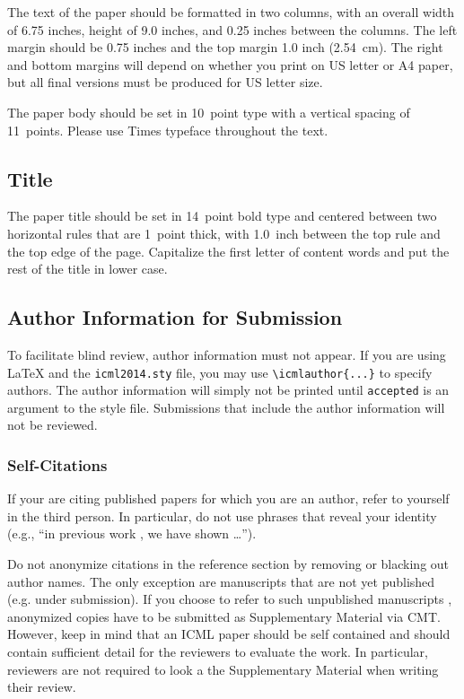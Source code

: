 \documentclass{article}
\begin{document}
The text of the paper should be formatted in two columns, with an
overall width of 6.75 inches, height of 9.0 inches, and 0.25 inches
between the columns. The left margin should be 0.75 inches and the top
margin 1.0 inch (2.54~cm). The right and bottom margins will depend on
whether you print on US letter or A4 paper, but all final versions
must be produced for US letter size.

The paper body should be set in 10~point type with a vertical spacing
of 11~points. Please use Times  typeface throughout the text.

\subsection{Title}

The paper title should be set in 14~point bold type and centered
between two horizontal rules that are 1~point thick, with 1.0~inch
between the top rule and the top edge of the page. Capitalize the
first letter of content words and put the rest of the title in lower
case.

\subsection{Author Information for Submission}
\label{author info}

To facilitate blind review, author information must not appear.  If
you are using \LaTeX\/ and the \texttt{icml2014.sty} file, you may use
\verb+\icmlauthor{...}+ to specify authors.  The author information
will simply not be printed until {\tt accepted} is an argument to the
style file. Submissions that include the author information will not
be reviewed.

\subsubsection{Self-Citations}

If your are citing published papers for which you are an author, refer
to yourself in the third person. In particular, do not use phrases
that reveal your identity (e.g., ``in previous work \cite{langley00}, we 
have shown \ldots'').

Do not anonymize citations in the reference section by removing or
blacking out author names. The only exception are manuscripts that are
not yet published (e.g. under submission). If you choose to refer to
such unpublished manuscripts \cite{anonymous}, anonymized copies have 
to be submitted
as Supplementary Material via CMT. However, keep in mind that an ICML
paper should be self contained and should contain sufficient detail
for the reviewers to evaluate the work. In particular, reviewers are
not required to look a the Supplementary Material when writing their
review.
\end{document}
